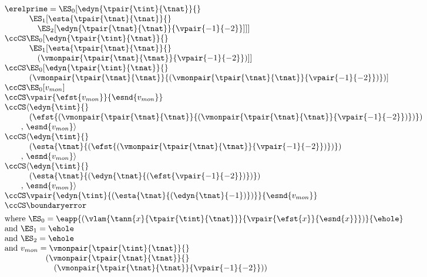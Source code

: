 $\begin{array}{l}
  \erelprime = \ES_0[\edyn{\tpair{\tint}{\tnat}}{}
\\\qquad\quad \ES_1[\esta{\tpair{\tnat}{\tnat}}{}
\\\qquad\quad\quad \ES_2[\edyn{\tpair{\tnat}{\tnat}}{\vpair{-1}{-2}}]]]
\\\ccCS \ES_0[\edyn{\tpair{\tint}{\tnat}}{}
\\\qquad\quad \ES_1[\esta{\tpair{\tnat}{\tnat}}{}
\\\qquad\quad\quad (\vmonpair{\tpair{\tnat}{\tnat}}{\vpair{-1}{-2}})]]
\\\ccCS \ES_0[\edyn{\tpair{\tint}{\tnat}}{}
\\\qquad\quad (\vmonpair{\tpair{\tnat}{\tnat}}{(\vmonpair{\tpair{\tnat}{\tnat}}{\vpair{-1}{-2}})})]
\\\ccCS \ES_0[v_{mon}]
\\\ccCS \vpair{\efst{v_{mon}}}{\esnd{v_{mon}}}
\\\ccCS \langle\edyn{\tint}{}
\\\qquad\quad (\efst{(\vmonpair{\tpair{\tnat}{\tnat}}{(\vmonpair{\tpair{\tnat}{\tnat}}{\vpair{-1}{-2}})})})
\\\qquad ,\,{\esnd{v_{mon}}}\rangle
\\\ccCS \langle\edyn{\tint}{}
\\\qquad\quad (\esta{\tnat}{(\efst{(\vmonpair{\tpair{\tnat}{\tnat}}{\vpair{-1}{-2}})})})
\\\qquad ,\,{\esnd{v_{mon}}}\rangle
\\\ccCS \langle\edyn{\tint}{}
\\\qquad\quad (\esta{\tnat}{(\edyn{\tnat}{(\efst{\vpair{-1}{-2}})})})
\\\qquad ,\,\esnd{v_{mon}}\rangle
\\\ccCS \vpair{\edyn{\tint}{(\esta{\tnat}{(\edyn{\tnat}{{-1}})})}}{\esnd{v_{mon}}}
\\\ccCS \boundaryerror
\\[1ex]
  \mbox{where } \ES_0 = \eapp{(\vlam{\tann{x}{\tpair{\tint}{\tnat}}}{\vpair{\efst{x}}{\esnd{x}}})}{\ehole}
\\\mbox{and } \ES_1 = \ehole
\\\mbox{and } \ES_2 = \ehole
\\\mbox{and } v_{mon} = \vmonpair{\tpair{\tint}{\tnat}}{}
\\\quad\quad\quad\quad\quad (\vmonpair{\tpair{\tnat}{\tnat}}{}
\\\quad\quad\quad\quad\quad\quad (\vmonpair{\tpair{\tnat}{\tnat}}{\vpair{-1}{-2}}))
\end{array}$


